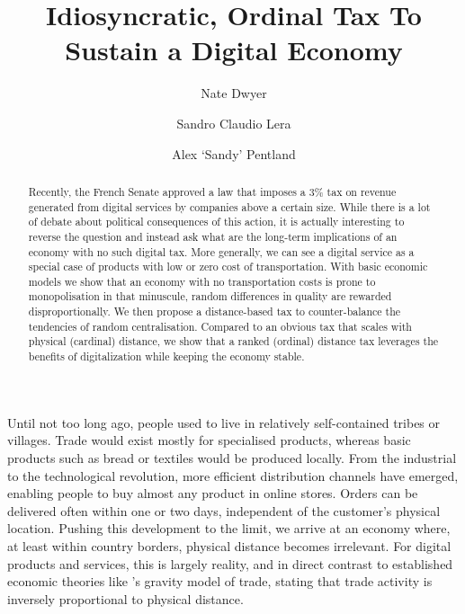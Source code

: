 \documentclass[final,5p,times,twocolumn,11pt,authoryear]{elsarticle}
\numberwithin{equation}{section} %
\begin{document}
\begin{frontmatter}

\title{Idiosyncratic, Ordinal Tax To Sustain a Digital Economy}

\author{Nate Dwyer}

\author{Sandro Claudio Lera}

\author{Alex `Sandy' Pentland}

\address{Massachusetts Institute of Technology, 77 Massachusetts Avenue, 02139 Cambridge, Massachusetts, USA}

\begin{abstract}

Recently, the French Senate approved a law that imposes a $3\%$ tax on revenue generated from digital services by companies above a certain size. 
While there is a lot of debate about political consequences of this action, it is actually interesting to reverse the question and instead ask what are the long-term implications of an economy with no such digital tax. 
More generally, we can see a digital service as a special case of products with low or zero cost of transportation. 
With basic economic models we show that an economy with no transportation costs is prone to monopolisation in that minuscule, random differences in quality are rewarded disproportionally. 
We then propose a distance-based tax to counter-balance the tendencies of random centralisation.  
Compared to an obvious tax that scales with physical (cardinal) distance, we show that a ranked (ordinal) distance tax leverages the benefits of digitalization while keeping the economy stable. 

\end{abstract} 

\end{frontmatter}

Until not too long ago, people used to live in relatively self-contained tribes or villages. 
Trade would exist mostly for specialised products, whereas basic products such as bread or textiles would be produced locally. 
From the industrial to the technological revolution, more efficient distribution channels have emerged, enabling people to buy almost any product in online stores. 
Orders can be delivered often within one or two days, independent of the customer’s physical location. 
Pushing this development to the limit, we arrive at an economy where, at least within country borders, physical distance becomes irrelevant. 
For digital products and services, this is largely reality, and in direct contrast to established economic theories like \cite{Isard1954}'s gravity model of trade, stating that trade activity is inversely proportional to physical distance. 
\end{document}
